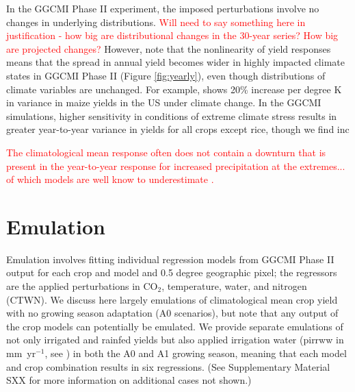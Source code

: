 \documentclass[gmd, manuscript]{copernicus} %
\begin{document}
In the GGCMI Phase II experiment, the imposed perturbations involve no changes in underlying distributions. %
\textcolor{red}{Will need to say something here in justification - how big are distributional changes in the 30-year series? How big are projected changes?}
However, note that the nonlinearity of yield responses means that the spread in annual yield becomes wider in highly impacted climate states in GGCMI Phase II (Figure \ref{fig:yearly}), even though distributions of climate variables are unchanged.
For example, \cite{Urban2012} shows 20\% increase per degree K in variance in maize yields in the US under climate change.
In the GGCMI simulations, higher sensitivity in conditions of extreme climate stress results in greater year-to-year variance in yields for all crops except rice, though we find inc 

\textcolor{red}{The climatological mean response often does not contain a downturn that is present in the year-to-year response for increased precipitation at the extremes... of which models are well know to underestimate \citep{Glotter15,Li2019}.}

\section{Emulation}
\label{S:3}
Emulation involves fitting individual regression models from GGCMI Phase II output for each crop and model and 0.5 degree geographic pixel; the regressors are the applied perturbations in CO$_2$, temperature, water, and nitrogen (CTWN). 
We discuss here largely emulations of climatological mean crop yield with no growing season adaptation (A0 scenarios), but note that any output of the crop models can potentially be emulated. 
We provide separate emulations of not only irrigated and rainfed yields but also applied irrigation water (pirrww in mm\ yr$^{-1}$, see \citep{Franke2019a}) in both the A0 and A1 growing season, meaning that each model and crop combination results in six regressions. (See Supplementary Material SXX for more information on additional cases not shown.)
\end{document}
